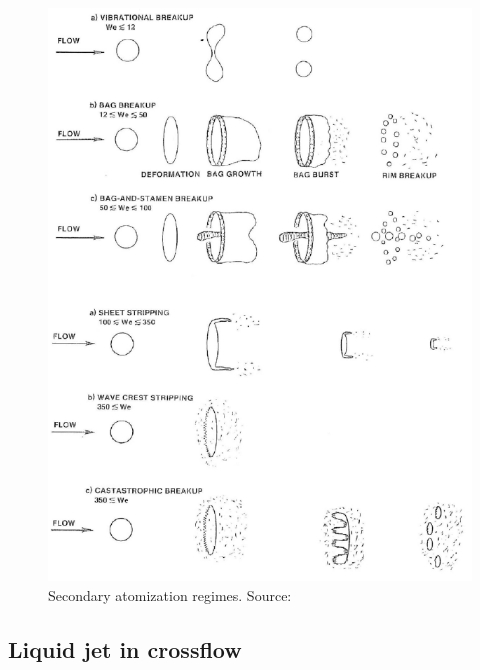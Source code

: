 \begin{itemize}
	\begin{figure}[h!]
		\centering
		\includegraphics[scale=1.0]{./part0_intro/regimes_atomization_secondary}
		\caption[Secondary atomization regimes]{Secondary atomization regimes. Source: }
		\label{fig:regimes_atomization_secondary}
	\end{figure}

\end{itemize}



\subsection*{Liquid jet in crossflow}

